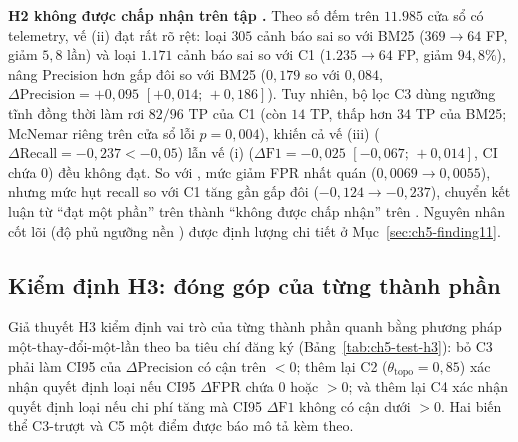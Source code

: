 \textbf{H2 không được chấp nhận trên tập .} Theo số đếm trên $11.985$ cửa sổ có telemetry, vế (ii) đạt rất rõ rệt: \CTAV{} loại $305$ cảnh báo sai so với BM25 ($369 \to 64$ FP, giảm $5{,}8$ lần) và loại $1.171$ cảnh báo sai so với C1 ($1.235 \to 64$ FP, giảm $94{,}8\%$), nâng Precision hơn gấp đôi so với BM25 ($0{,}179$ so với $0{,}084$, $\Delta\text{Precision} = +0{,}095$ $[+0{,}014;\, +0{,}186]$). Tuy nhiên, bộ lọc C3 dùng ngưỡng tĩnh  đồng thời làm rơi $82 / 96$ TP của C1 (còn $14$ TP, thấp hơn $34$ TP của BM25; McNemar riêng trên cửa sổ lỗi $p = 0{,}004$), khiến cả vế (iii) ($\Delta\text{Recall} = -0{,}237 < -0{,}05$) lẫn vế (i) ($\Delta\text{F1} = -0{,}025$ $[-0{,}067;\, +0{,}014]$, CI chứa $0$) đều không đạt. So với , mức giảm FPR nhất quán ($0{,}0069 \to 0{,}0055$), nhưng mức hụt recall so với C1 tăng gần gấp đôi ($-0{,}124 \to -0{,}237$), chuyển kết luận từ ``đạt một phần'' trên  thành ``không được chấp nhận'' trên . Nguyên nhân cốt lõi (độ phủ ngưỡng nền ) được định lượng chi tiết ở Mục~\ref{sec:ch5-finding11}.

\subsection{Kiểm định H3: đóng góp của từng thành phần}
\label{sec:ch5-test-h3}

Giả thuyết H3 kiểm định vai trò của từng thành phần quanh \CTAV{} bằng phương pháp một-thay-đổi-một-lần theo ba tiêu chí đăng ký (Bảng~\ref{tab:ch5-test-h3}): bỏ C3 phải làm CI95 của $\Delta\text{Precision}$ có cận trên $< 0$; thêm lại C2 ($\theta_{\text{topo}} = 0{,}85$) xác nhận quyết định loại nếu CI95 $\Delta\text{FPR}$ chứa $0$ hoặc $> 0$; và thêm lại C4 xác nhận quyết định loại nếu chi phí tăng mà CI95 $\Delta\text{F1}$ không có cận dưới $> 0$. Hai biến thể C3-trượt và C5 một điểm được báo mô tả kèm theo.

